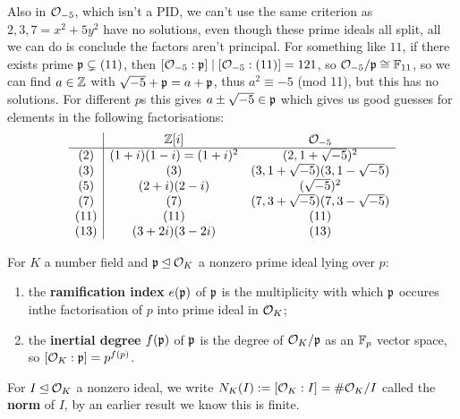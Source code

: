\documentclass{article}
\begin{document}
Also in $\mathcal{O}_{-5}$, which isn't a PID, we can't use the same criterion as $2,3,7=x^2+5y^2$ have no solutions, even though these prime ideals all split, all we can do is conclude the factors aren't principal. For something like $11$, if there exists prime $\mathfrak{p}\subsetneq (11)$, then $[\mathcal{O}_{-5}:\mathfrak{p}]\mid [\mathcal{O}_{-5}:(11)]=121$, so $\mathcal{O}_{-5}/\mathfrak{p}\cong\mathbb{F}_{11}$, so we can find $a\in \mathbb{Z}$ with $\sqrt{-5}+\mathfrak{p} = a+\mathfrak{p}$, thus $a^2\equiv -5$ (mod 11), but this has no solutions. For different $p$s this gives $a\pm\sqrt{-5}\in\mathfrak{p}$ which gives us good guesses for elements in the following factorisations:\[
\begin{array}{c|cc}
    & \mathbb{Z}[i] & \mathcal{O}_{-5} \\ \hline 
    (2) & (1+i)(1-i)=(1+i)^2 & (2,1+\sqrt{-5})^2\\
    (3) & (3) & (3,1+\sqrt{-5})(3,1-\sqrt{-5})\\
    (5) & (2+i)(2-i) & (\sqrt{-5})^2 \\
    (7) & (7) & (7,3+\sqrt{-5})(7,3-\sqrt{-5})\\
    (11) & (11) & (11) \\
    (13) & (3+2i)(3-2i) & (13)
\end{array}
\]

\begin{definition}
    For $K$ a number field and $\mathfrak{p}\unlhd \mathcal{O}_K$ a nonzero prime ideal lying over $p$: \begin{enumerate}
        \item the \textbf{ramification index} $e(\mathfrak{p})$ of $\mathfrak{p}$ is the multiplicity with which $\mathfrak{p}$ occures inthe factorisation of $p$ into prime ideal in $\mathcal{O}_K$;
        \item the \textbf{inertial degree} $f(\mathfrak{p})$ of $\mathfrak{p}$ is the degree of $\mathcal{O}_K/\mathfrak{p}$ as an $\mathbb{F}_p$ vector space, so $[\mathcal{O}_K:\mathfrak{p}]=p^{f(p)}$.
    \end{enumerate}
    For $I\unlhd \mathcal{O}_K$ a nonzero ideal, we write $N_K(I):=[\mathcal{O}_K:I] = \# \mathcal{O}_K/I$ called the \textbf{norm} of $I$, by an earlier result we know this is finite.
\end{definition}
\end{document}
